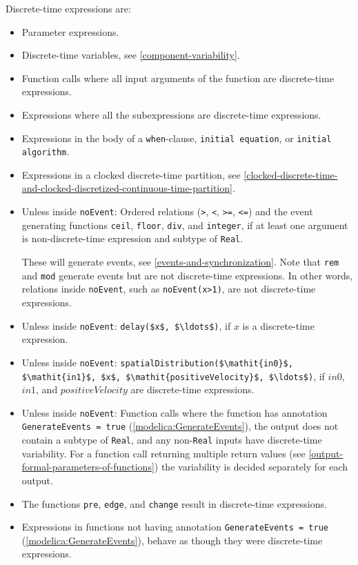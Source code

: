 Discrete-time expressions are:
\begin{itemize}
\item
  Parameter expressions.
\item
  Discrete-time variables, see \cref{component-variability}.
\item
  Function calls where all input arguments of the function are discrete-time expressions.
\item
  Expressions where all the subexpressions are discrete-time expressions.
\item
  Expressions in the body of a \lstinline!when!-clause, \lstinline!initial equation!, or \lstinline!initial algorithm!.
\item
  Expressions in a clocked discrete-time partition, see \cref{clocked-discrete-time-and-clocked-discretized-continuous-time-partition}.
\item
  Unless inside \lstinline!noEvent!: Ordered relations (\lstinline!>!, \lstinline!<!, \lstinline!>=!, \lstinline!<=!) and the event generating functions \lstinline!ceil!, \lstinline!floor!, \lstinline!div!, and \lstinline!integer!, if at least one argument is non-discrete-time expression and subtype of \lstinline!Real!.
  \begin{nonnormative}
  These will generate events, see \cref{events-and-synchronization}.
  Note that \lstinline!rem! and \lstinline!mod! generate events but are not discrete-time expressions.
  In other words, relations inside \lstinline!noEvent!, such as \lstinline!noEvent(x>1)!, are not discrete-time expressions.
  \end{nonnormative}
\item
  Unless inside \lstinline!noEvent!: \lstinline!delay($x$, $\ldots$)!, if $x$ is a discrete-time expression.
\item
  Unless inside \lstinline!noEvent!: \lstinline!spatialDistribution($\mathit{in0}$, $\mathit{in1}$, $x$, $\mathit{positiveVelocity}$, $\ldots$)!, if $\mathit{in0}$, $\mathit{in1}$, and $\mathit{positiveVelocity}$ are discrete-time expressions.
\item
  Unless inside \lstinline!noEvent!: Function calls where the function has annotation \lstinline!GenerateEvents = true! (\cref{modelica:GenerateEvents}), the output does not contain a subtype of \lstinline!Real!, and any non-\lstinline!Real! inputs have discrete-time variability.
  For a function call returning multiple return values (see \cref{output-formal-parameters-of-functions}) the variability is decided separately for each output.
\item
  The functions \lstinline!pre!, \lstinline!edge!, and \lstinline!change! result in discrete-time expressions.
\item
  Expressions in functions not having annotation \lstinline!GenerateEvents = true! (\cref{modelica:GenerateEvents}), behave as though they were discrete-time expressions.
\end{itemize}

